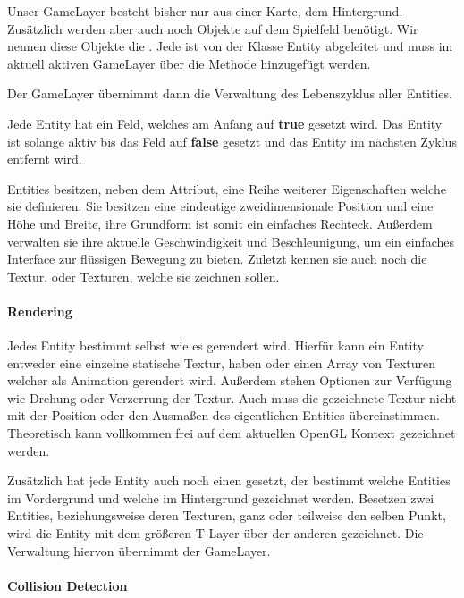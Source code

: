 
Unser GameLayer besteht bisher nur aus einer Karte, dem Hintergrund.
Zusätzlich werden aber auch noch Objekte auf dem Spielfeld benötigt. Wir nennen diese Objekte die . 
Jede  ist von der Klasse Entity abgeleitet und muss im aktuell aktiven GameLayer über die Methode  hinzugefügt werden.

Der GameLayer übernimmt dann die Verwaltung des Lebenszyklus aller Entities.


Jede Entity hat ein  Feld, welches am Anfang auf \textbf{true} gesetzt wird. Das Entity ist solange aktiv bis das Feld auf \textbf{false} gesetzt und das Entity im nächsten Zyklus entfernt wird.

Entities besitzen, neben dem  Attribut, eine Reihe weiterer Eigenschaften welche sie definieren. Sie besitzen eine eindeutige zweidimensionale Position und eine Höhe und Breite, ihre Grundform ist somit ein einfaches Rechteck. Außerdem verwalten sie ihre aktuelle Geschwindigkeit und Beschleunigung, um ein einfaches Interface zur flüssigen Bewegung zu bieten. Zuletzt kennen sie auch noch die Textur, oder Texturen, welche sie zeichnen sollen.

\paragraph{Rendering}

Jedes Entity bestimmt selbst wie es gerendert wird. Hierfür kann ein Entity entweder eine einzelne statische Textur, haben oder einen Array von Texturen welcher als Animation gerendert wird. Außerdem stehen Optionen zur Verfügung wie Drehung oder Verzerrung der Textur.
Auch muss die gezeichnete Textur nicht mit der Position oder den Ausmaßen des eigentlichen Entities übereinstimmen. Theoretisch kann vollkommen frei auf dem aktuellen OpenGL Kontext gezeichnet werden.

Zusätzlich hat jede Entity auch noch einen  gesetzt, der bestimmt welche Entities im Vordergrund und welche im Hintergrund gezeichnet werden. Besetzen zwei Entities, beziehungsweise deren Texturen, ganz oder teilweise den selben Punkt, wird die Entity mit dem größeren T-Layer über der anderen gezeichnet. Die Verwaltung hiervon übernimmt der GameLayer.
	
\paragraph{Collision Detection}

